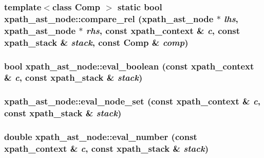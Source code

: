 \label{classxpath__ast__node_a16805022b8f8b8f26061b11d0f8e01b5}
\hypertarget{classxpath__ast__node_a055805c7365ac7d99174d2bf7a0cd5e2}{
\subsubsection[{compare\_\-rel}]{\setlength{\rightskip}{0pt plus 5cm}template$<$class Comp $>$ static bool xpath\_\-ast\_\-node::compare\_\-rel ({\bf xpath\_\-ast\_\-node} $\ast$ {\em lhs}, \/  {\bf xpath\_\-ast\_\-node} $\ast$ {\em rhs}, \/  const {\bf xpath\_\-context} \& {\em c}, \/  const {\bf xpath\_\-stack} \& {\em stack}, \/  const Comp \& {\em comp})}}
\label{classxpath__ast__node_a055805c7365ac7d99174d2bf7a0cd5e2}
\hypertarget{classxpath__ast__node_ab7f965a92023bc2704b8e6fd9f3d7c14}{
\subsubsection[{eval\_\-boolean}]{\setlength{\rightskip}{0pt plus 5cm}bool xpath\_\-ast\_\-node::eval\_\-boolean (const {\bf xpath\_\-context} \& {\em c}, \/  const {\bf xpath\_\-stack} \& {\em stack})}}
\label{classxpath__ast__node_ab7f965a92023bc2704b8e6fd9f3d7c14}
\hypertarget{classxpath__ast__node_a30d98ec97e3129e82ac9ec3f2a759855}{
\subsubsection[{eval\_\-node\_\-set}]{ xpath\_\-ast\_\-node::eval\_\-node\_\-set (const {\bf xpath\_\-context} \& {\em c}, \/  const {\bf xpath\_\-stack} \& {\em stack})}}
\label{classxpath__ast__node_a30d98ec97e3129e82ac9ec3f2a759855}
\hypertarget{classxpath__ast__node_a92dd7048e28d486bc7f382d1fc6f1de6}{
\subsubsection[{eval\_\-number}]{\setlength{\rightskip}{0pt plus 5cm}double xpath\_\-ast\_\-node::eval\_\-number (const {\bf xpath\_\-context} \& {\em c}, \/  const {\bf xpath\_\-stack} \& {\em stack})}}
